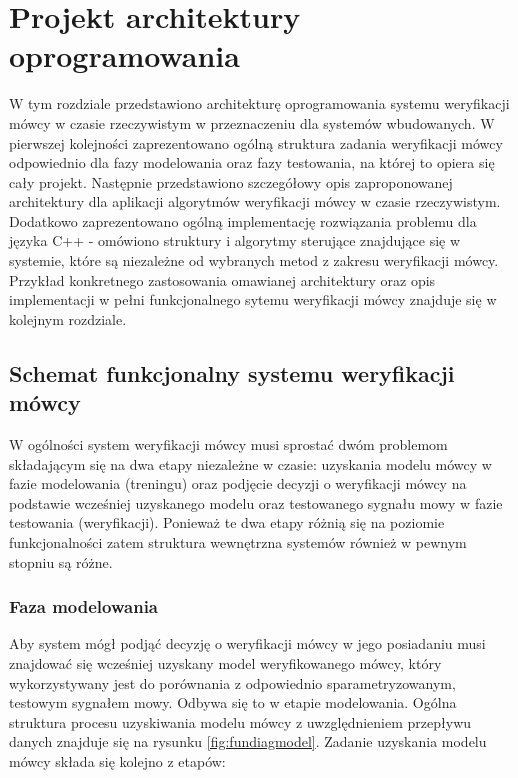 \chapter{Projekt architektury oprogramowania}

W tym rozdziale przedstawiono architekturę oprogramowania systemu weryfikacji mówcy w czasie rzeczywistym w przeznaczeniu dla systemów wbudowanych. W pierwszej kolejności zaprezentowano ogólną struktura zadania weryfikacji mówcy odpowiednio dla fazy modelowania oraz fazy testowania, na której to opiera się cały projekt. Następnie przedstawiono szczegółowy opis zaproponowanej architektury dla aplikacji algorytmów weryfikacji mówcy w czasie rzeczywistym. Dodatkowo
zaprezentowano ogólną implementację rozwiązania problemu dla języka C++ - omówiono struktury i algorytmy sterujące znajdujące się w systemie, które są niezależne od wybranych metod z zakresu weryfikacji mówcy. Przykład konkretnego zastosowania omawianej architektury oraz opis implementacji w pełni funkcjonalnego sytemu weryfikacji mówcy znajduje się w kolejnym rozdziale.


\section{Schemat funkcjonalny systemu weryfikacji mówcy}
\label{funcioniert}

W ogólności system weryfikacji mówcy musi sprostać dwóm problemom składającym się na dwa etapy niezależne w czasie: uzyskania modelu mówcy w fazie modelowania (treningu) oraz podjęcie decyzji o weryfikacji mówcy na podstawie wcześniej uzyskanego modelu oraz testowanego sygnału mowy w fazie testowania (weryfikacji). Ponieważ te dwa etapy różnią się na poziomie funkcjonalności zatem struktura wewnętrzna systemów również w pewnym stopniu są różne.

\subsection{Faza modelowania}

Aby system mógł podjąć decyzję o weryfikacji mówcy w jego posiadaniu musi znajdować się wcześniej uzyskany model weryfikowanego mówcy, który wykorzystywany jest do porównania z odpowiednio sparametryzowanym, testowym sygnałem mowy. Odbywa się to w etapie modelowania. Ogólna struktura procesu uzyskiwania modelu mówcy z uwzględnieniem przepływu danych znajduje się na rysunku {\ref{fig:fundiagmodel}}. Zadanie uzyskania modelu mówcy składa się kolejno z etapów:

